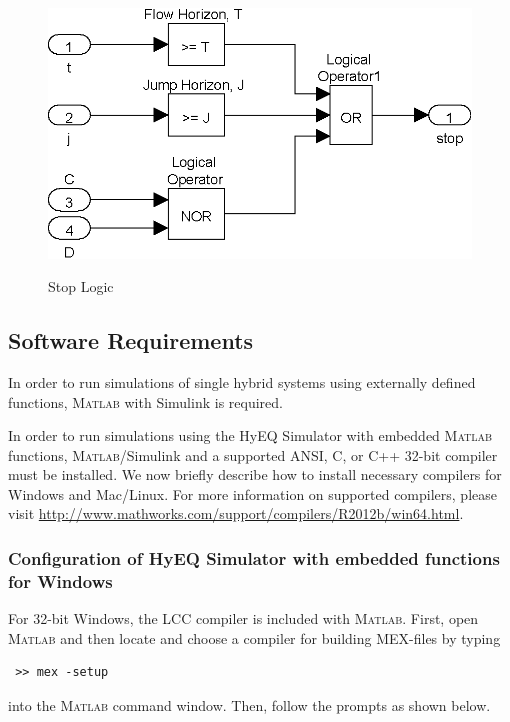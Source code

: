 \documentclass{article}
\newcommand{\matlab}{\textsc{Matlab}}
\begin{document}
\begin{figure}[ht]
  \begin{center}
    {\includegraphics[width=.5\textwidth]{figures/Simulink/StopLogic.eps}}
   \caption{Stop Logic}
\label{fig:StopLogic}
  \end{center}
\end{figure}

%

\subsection{Software Requirements}
In order to run simulations of single hybrid systems using externally defined functions, \matlab{} with Simulink is required.

In order to run simulations using the HyEQ Simulator with embedded \matlab{} functions, \matlab{}/Simulink and a supported ANSI, C, or C++ 32-bit compiler must be installed. We now briefly describe how to install necessary compilers for Windows and Mac/Linux. For more information on supported compilers, please visit \url{http://www.mathworks.com/support/compilers/R2012b/win64.html}.


\subsubsection{Configuration of HyEQ Simulator with embedded functions for Windows}
For 32-bit Windows, the LCC compiler is included with \matlab{}. First, open \matlab{} and then locate and choose a compiler for building MEX-files by typing \begin{verbatim} >> mex -setup \end{verbatim}
into the \matlab{} command window. Then, follow the prompts as shown below.
\end{document}
